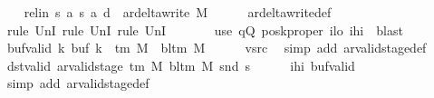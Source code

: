 \begin{isabellebody}
\isanewline
\ \ \isamarkupfalse%
\ rel{\isacharunderscore}{\kern0pt}in{\isacharcolon}{\kern0pt}\ {\isachardoublequoteopen}{\isacharparenleft}{\kern0pt}{\isacharquery}{\kern0pt}s{\isacharcomma}{\kern0pt}\ {\isacharquery}{\kern0pt}a{\isacharcomma}{\kern0pt}\ {\isacharquery}{\kern0pt}s{\isacharprime}{\kern0pt}{\isacharcomma}{\kern0pt}\ {\isacharquery}{\kern0pt}a{\isacharprime}{\kern0pt}{\isacharcomma}{\kern0pt}\ {\isacharquery}{\kern0pt}d{\isacharparenright}{\kern0pt}\ {\isasymin}\ ar{\isacharunderscore}{\kern0pt}delta{\isacharunderscore}{\kern0pt}write\ M{\isachardoublequoteclose}\isanewline
\ \ \ \ \isamarkupfalse%
\ ar{\isacharunderscore}{\kern0pt}delta{\isacharunderscore}{\kern0pt}write{\isacharunderscore}{\kern0pt}def\isanewline
\ \ \ \ \isamarkupfalse%
\ {\isacharparenleft}{\kern0pt}rule\ UnI{}{\isacharcomma}{\kern0pt}\ rule\ UnI{}{\isacharcomma}{\kern0pt}\ rule\ UnI{}{\isacharparenright}{\kern0pt}\isanewline
\ \ \ \ \ \ \ {\isacharparenleft}{\kern0pt}use\ qQ\ poskproper\ ilo\ ihi\ \ blast{\isacharparenright}{\kern0pt}\isanewline
\ \ \isamarkupfalse%
\ buf{\isacharunderscore}{\kern0pt}valid{\isacharcolon}{\kern0pt}\ {\isachardoublequoteopen}{\isasymforall}k{\isachardot}{\kern0pt}\ buf\ k\ {\isasymin}\ {\isasymGamma}{\isacharunderscore}{\kern0pt}tm\ M\ {\isasymunion}\ {\isacharbraceleft}{\kern0pt}bl{\isacharunderscore}{\kern0pt}tm\ M{\isacharbraceright}{\kern0pt}{\isachardoublequoteclose}\isanewline
\ \ \ \ \isamarkupfalse%
\ vsrc\ \isamarkupfalse%
\ {\isacharparenleft}{\kern0pt}simp\ add{\isacharcolon}{\kern0pt}\ ar{\isacharunderscore}{\kern0pt}valid{\isacharunderscore}{\kern0pt}stage{\isacharunderscore}{\kern0pt}def{\isacharparenright}{\kern0pt}\isanewline
\ \ \isamarkupfalse%
\ dst{\isacharunderscore}{\kern0pt}valid{\isacharcolon}{\kern0pt}\ {\isachardoublequoteopen}ar{\isacharunderscore}{\kern0pt}valid{\isacharunderscore}{\kern0pt}stage\ {\isacharparenleft}{\kern0pt}{\isasymGamma}{\isacharunderscore}{\kern0pt}tm\ M{\isacharparenright}{\kern0pt}\ {\isacharparenleft}{\kern0pt}bl{\isacharunderscore}{\kern0pt}tm\ M{\isacharparenright}{\kern0pt}\ {\isacharparenleft}{\kern0pt}snd\ {\isacharquery}{\kern0pt}s{\isacharprime}{\kern0pt}{\isacharparenright}{\kern0pt}{\isachardoublequoteclose}\isanewline
\ \ \ \ \isamarkupfalse%
\ ihi\ buf{\isacharunderscore}{\kern0pt}valid\ \isamarkupfalse%
\ {\isacharparenleft}{\kern0pt}simp\ add{\isacharcolon}{\kern0pt}\ ar{\isacharunderscore}{\kern0pt}valid{\isacharunderscore}{\kern0pt}stage{\isacharunderscore}{\kern0pt}def{\isacharparenright}{\kern0pt}\isanewline

\end{isabellebody}
